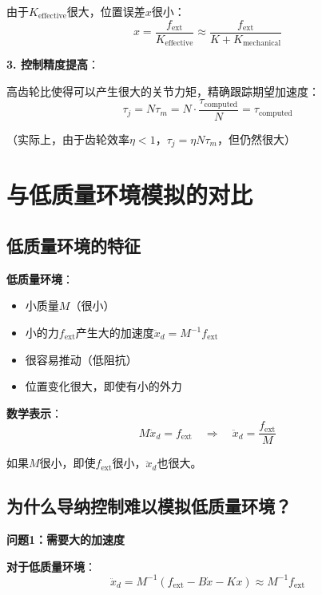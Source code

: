 \documentclass[12pt,a4paper]{article}
\begin{document}
由于$K_{\text{effective}}$很大，位置误差$x$很小：
\begin{equation}
x = \frac{f_{\text{ext}}}{K_{\text{effective}}} \approx \frac{f_{\text{ext}}}{K + K_{\text{mechanical}}}
\end{equation}

\textbf{3. 控制精度提高}：

高齿轮比使得可以产生很大的关节力矩，精确跟踪期望加速度：
\begin{equation}
\tau_j = N\tau_m = N \cdot \frac{\tau_{\text{computed}}}{N} = \tau_{\text{computed}}
\end{equation}

（实际上，由于齿轮效率$\eta < 1$，$\tau_j = \eta N\tau_m$，但仍然很大）

\section{与低质量环境模拟的对比}

\subsection{低质量环境的特征}

\textbf{低质量环境}：
\begin{itemize}
\item 小质量$M$（很小）
\item 小的力$f_{\text{ext}}$产生大的加速度$\ddot{x}_d = M^{-1}f_{\text{ext}}$
\item 很容易推动（低阻抗）
\item 位置变化很大，即使有小的外力
\end{itemize}

\textbf{数学表示}：
\begin{equation}
M\ddot{x}_d = f_{\text{ext}} \quad \Rightarrow \quad \ddot{x}_d = \frac{f_{\text{ext}}}{M}
\end{equation}

如果$M$很小，即使$f_{\text{ext}}$很小，$\ddot{x}_d$也很大。

\subsection{为什么导纳控制难以模拟低质量环境？}

\textbf{问题1：需要大的加速度}

\textbf{对于低质量环境}：
\begin{equation}
\ddot{x}_d = M^{-1}(f_{\text{ext}} - B\dot{x} - Kx) \approx M^{-1}f_{\text{ext}}
\end{equation}
\end{document}
